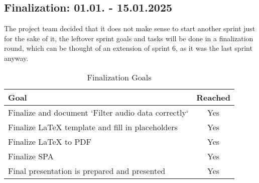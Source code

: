 \subsection{Finalization: 01.01. - 15.01.2025}\label{subsec:sprint-finalization}
The project team decided that it does not make sense to start another sprint just for the sake of it, the leftover
sprint goals and tasks will be done in a finalization round, which can be thought of an extension of sprint 6,
as it was the last sprint anyway.
\begin{table}[H]
    \centering
    \begin{tabularx}{\textwidth}{X c}
        \toprule
        \textbf{Goal}                                         & \textbf{Reached} \\
        \midrule
        Finalize and document `Filter audio data correctly`   & Yes              \\
        \midrule
        Finalize LaTeX template and fill in placeholders      & Yes              \\
        \midrule
        Finalize LaTeX to PDF                                 & Yes              \\
        \midrule
        Finalize SPA                                          & Yes              \\
        \midrule
        Final presentation is prepared and presented          & Yes              \\
        \bottomrule
    \end{tabularx}
    \caption{Finalization Goals}\label{tab:finalization-goals}
\end{table}